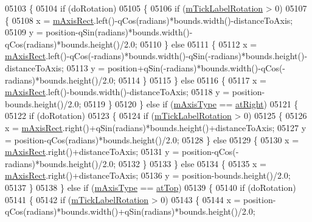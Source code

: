 \begin{DoxyCode}
05103   \{
05104     \textcolor{keywordflow}{if} (doRotation)
05105     \{
05106       \textcolor{keywordflow}{if} (\hyperlink{a00025_a47660c8694884cdb87495bf8b4c8a3b9}{mTickLabelRotation} > 0)
05107       \{
05108         x = \hyperlink{a00025_ad63d51f30f835f3a568b6231362ed4a0}{mAxisRect}.left()-qCos(radians)*bounds.width()-distanceToAxis;
05109         y = position-qSin(radians)*bounds.width()-qCos(radians)*bounds.height()/2.0;
05110       \} \textcolor{keywordflow}{else}
05111       \{
05112         x = \hyperlink{a00025_ad63d51f30f835f3a568b6231362ed4a0}{mAxisRect}.left()-qCos(-radians)*bounds.width()-qSin(-radians)*bounds.height()-
      distanceToAxis;
05113         y = position+qSin(-radians)*bounds.width()-qCos(-radians)*bounds.height()/2.0;
05114       \}
05115     \} \textcolor{keywordflow}{else}
05116     \{
05117       x = \hyperlink{a00025_ad63d51f30f835f3a568b6231362ed4a0}{mAxisRect}.left()-bounds.width()-distanceToAxis;
05118       y = position-bounds.height()/2.0;
05119     \}
05120   \} \textcolor{keywordflow}{else} \textcolor{keywordflow}{if} (\hyperlink{a00025_ae704bf9f2c2b026f08dd4ccad79c616e}{mAxisType} == \hyperlink{a00025_ae2bcc1728b382f10f064612b368bc18aadf5509f7d29199ef2f263b1dd224b345}{atRight})
05121   \{
05122     \textcolor{keywordflow}{if} (doRotation)
05123     \{
05124       \textcolor{keywordflow}{if} (\hyperlink{a00025_a47660c8694884cdb87495bf8b4c8a3b9}{mTickLabelRotation} > 0)
05125       \{
05126         x = \hyperlink{a00025_ad63d51f30f835f3a568b6231362ed4a0}{mAxisRect}.right()+qSin(radians)*bounds.height()+distanceToAxis;
05127         y = position-qCos(radians)*bounds.height()/2.0;
05128       \} \textcolor{keywordflow}{else}
05129       \{
05130         x = \hyperlink{a00025_ad63d51f30f835f3a568b6231362ed4a0}{mAxisRect}.right()+distanceToAxis;
05131         y = position-qCos(-radians)*bounds.height()/2.0;
05132       \}
05133     \} \textcolor{keywordflow}{else}
05134     \{
05135       x = \hyperlink{a00025_ad63d51f30f835f3a568b6231362ed4a0}{mAxisRect}.right()+distanceToAxis;
05136       y = position-bounds.height()/2.0;
05137     \}
05138   \} \textcolor{keywordflow}{else} \textcolor{keywordflow}{if} (\hyperlink{a00025_ae704bf9f2c2b026f08dd4ccad79c616e}{mAxisType} == \hyperlink{a00025_ae2bcc1728b382f10f064612b368bc18aac0ece2b680d3f545e701f75af1655977}{atTop})
05139   \{
05140     \textcolor{keywordflow}{if} (doRotation)
05141     \{
05142       \textcolor{keywordflow}{if} (\hyperlink{a00025_a47660c8694884cdb87495bf8b4c8a3b9}{mTickLabelRotation} > 0)
05143       \{
05144         x = position-qCos(radians)*bounds.width()+qSin(radians)*bounds.height()/2.0;

\end{DoxyCode}
